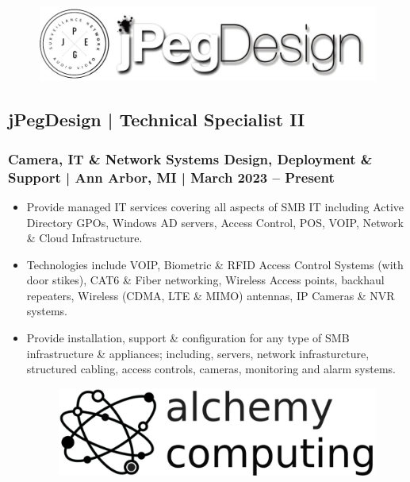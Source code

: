 \documentclass[letter,10pt]{article}
\begin{document}
\begin{figure}
\includegraphics[width=0.8\linewidth]{./img/jpeg_banner.jpg}
\end{figure}

\subsection*{jPegDesign | Technical Specialist II}
\label{sec:org8e89381}
\subsubsection*{Camera, IT \& Network Systems Design, Deployment \& Support | Ann Arbor, MI | March 2023 – Present}
\label{sec:org6334b78}
\begin{itemize}
\item Provide managed IT services covering all aspects of SMB IT including Active Directory GPOs, Windows AD servers, Access Control, POS, VOIP, Network \& Cloud Infrastructure.
\label{sec:org5037e58}
\item Technologies include VOIP, Biometric \& RFID Access Control Systems (with door stikes), CAT6 \& Fiber networking, Wireless Access points, backhaul repeaters, Wireless (CDMA, LTE \& MIMO) antennas, IP Cameras \& NVR systems.
\label{sec:orge10fbce}
\item Provide installation, support \& configuration for any type of SMB infrastructure \& appliances; including, servers, network infrasturcture, structured cabling, access controls, cameras, monitoring and alarm systems.
\label{sec:org2c9f547}




\begin{figure}
\includegraphics[width=0.8\linewidth]{./img/50p_alchemy_computing.jpg}
\end{figure}
\end{itemize}
\end{document}
